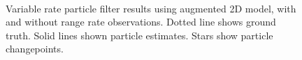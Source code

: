 \documentclass[conference]{IEEEtran}
\begin{document}
%
\begin{figure}[!t]
\centering
{}
\\
\caption{Variable rate particle filter results using augmented 2D model, with and without range rate observations. Dotted line shows ground truth. Solid lines shown particle estimates. Stars show particle changepoints.}
\label{fig:2D_Model2}
\end{figure}
\end{document}
